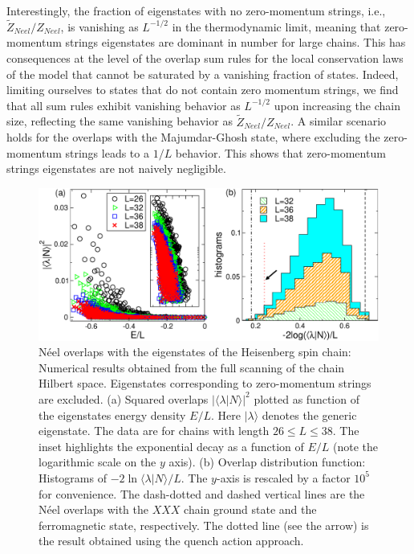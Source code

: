 \documentclass[11pt]{iopart}
\begin{document}
Interestingly, the fraction of eigenstates with no zero-momentum strings, i.e.,  
$\widetilde Z_{Neel}/Z_{Neel}$, is vanishing as $L^{-1/2}$ in the thermodynamic 
limit, meaning that zero-momentum strings eigenstates are dominant in number 
for large chains. This has consequences at the level of the overlap sum rules for the local conservation laws of 
the model that cannot be saturated by a vanishing fraction of states. 
Indeed, limiting ourselves to states that do not contain zero momentum strings, we find  that  all sum rules exhibit vanishing behavior as 
$L^{-1/2}$ upon increasing the chain size, reflecting the same vanishing behavior 
as $\widetilde Z_{Neel}/Z_{Neel}$. 
%
A similar scenario holds for the overlaps with 
the Majumdar-Ghosh state, where excluding the zero-momentum strings leads to a $1/L$ behavior. 
This shows that zero-momentum strings eigenstates are not naively negligible. 


\begin{figure}[t]
\begin{center}
\includegraphics[width=.9\textwidth]{./draft_figs/Neel_overlaps}
\end{center}
\caption{ N\'eel overlaps with the eigenstates of the Heisenberg spin 
 chain: Numerical results obtained from the full scanning of the chain 
 Hilbert space. Eigenstates corresponding to zero-momentum strings are 
 excluded. (a) Squared overlaps $|\langle\lambda|N\rangle|^2$ plotted as 
 function of the eigenstates energy density $E/L$. Here $|\lambda\rangle$ 
 denotes the generic eigenstate. The data are for chains with length $26
 \le L\le 38$. The inset highlights the exponential decay as a 
 function of $E/L$ (note the logarithmic scale on the $y$ axis). (b) 
 Overlap distribution function: Histograms of $-2\ln\langle\lambda|N\rangle/L$. 
 The $y$-axis is rescaled by a factor $10^5$ for convenience. The dash-dotted 
 and dashed vertical lines are the N\'eel overlaps with the $XXX$ chain ground 
 state and the ferromagnetic state, respectively. The dotted line (see 
 the arrow) is the result obtained using the quench action approach. 
}
\label{fig0:Neel-ov}
\end{figure}
\end{document}

